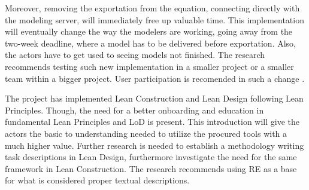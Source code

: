 Moreover, removing the exportation from the equation, connecting directly with the modeling server, will immediately free up valuable time. This implementation will eventually change the way the modelers are working, going away from the two-week deadline, where a model has to be delivered before exportation. Also, the actors have to get used to seeing models not finished. The research recommends testing such new implementation in a smaller project or a smaller team within a bigger project. User participation is recomended in such a change \cite{hatling1998social, ehn1993scandinavian}.

The project has implemented Lean Construction and Lean Design following Lean Principles. Though, the need for a better onboarding and education in fundamental Lean Principles and LoD is present. This introduction will give the actors the basic to understanding needed to utilize the procured tools with a much higher value. Further research is needed to establish a methodology writing task descriptions in Lean Design, furthermore investigate the need for the same framework in Lean Construction. The research recommends using RE as a base for what is considered proper textual descriptions. 

\cleardoublepage